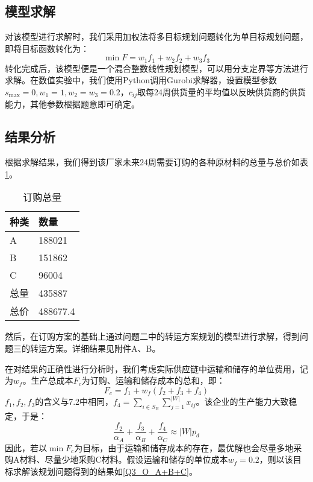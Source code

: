 \documentclass[withoutpreface,bwprint]{cumcmthesis} %
\begin{document}
\subsection{模型求解}

对该模型进行求解时，我们采用加权法将多目标规划问题转化为单目标规划问题，即将目标函数转化为：
\begin{equation}
    \min F = w_1f_1 + w_2f_2 + w_3f_3
\end{equation}
转化完成后，该模型便是一个混合整数线性规划模型，可以用分支定界等方法进行求解。在数值实验中，我们使用Python调用Gurobi求解器，设置模型参数$s_{\mathrm{max}} = 0, w_1 = 1, w_2 = w_3 = 0.2$，$c_{ij}$取每24周供货量的平均值以反映供货商的供货能力，其他参数根据题意即可确定。

\subsection{结果分析}

根据求解结果，我们得到该厂家未来24周需要订购的各种原材料的总量与总价如表\ref{Q3_O_C-A}。

\begin{table}[h]
    \caption{订购总量}\label{Q3_O_C-A} \centering
    \centering
    \begin{tabular}{|p{2.0cm}<{\centering}|p{9.0cm}<{\centering}|}
    \hline
    \textbf{种类} & \textbf{数量} \\ \hline
    A           & 188021         \\ \hline
    B           & 151862         \\ \hline
    C           & 96004          \\ \hline
    总量        & 435887 \\ \hline
    总价         & 488677.4          \\ \hline
    \end{tabular}
\end{table}

然后，在订购方案的基础上通过问题二中的转运方案规划的模型进行求解，得到问题三的转运方案。详细结果见附件A、B。

在对结果的正确性进行分析时，我们考虑实际供应链中运输和储存的单位费用，记为$w_f$。生产总成本$F_c$为订购、运输和储存成本的总和，即：
\begin{equation}
    F_c = f_1 + w_f(f_2 + f_3 + f_4)
\end{equation}
$f_1, f_2, f_3$的含义与7.2中相同，$f_4 = \sum\limits_{i \in S_B}\sum\limits_{j=1}^{|W|}x_{ij}$。该企业的生产能力大致稳定，于是：
\begin{equation}
    \frac{f_2}{\alpha_A} + \frac{f_3}{\alpha_B} + \frac{f_4}{\alpha_C} \approx |W|p_d
\end{equation}
因此，若以$\min F_c$为目标，由于运输和储存成本的存在，最优解也会尽量多地采购A材料、尽量少地采购C材料。假设运输和储存的单位成本$w_f = 0.2$，则以该目标求解该规划问题得到的结果如\ref{Q3_O_A+B+C}。
\end{document}
